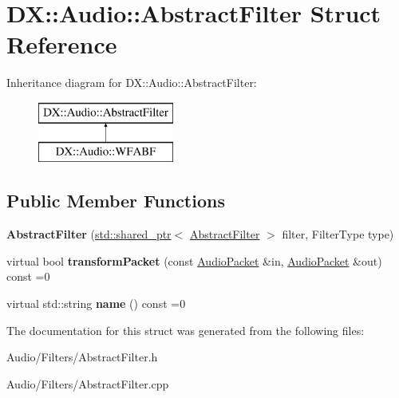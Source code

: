 \hypertarget{struct_d_x_1_1_audio_1_1_abstract_filter}{\section{D\-X\-:\-:Audio\-:\-:Abstract\-Filter Struct Reference}
\label{struct_d_x_1_1_audio_1_1_abstract_filter}
}
Inheritance diagram for D\-X\-:\-:Audio\-:\-:Abstract\-Filter\-:\begin{figure}[H]
\begin{center}
\leavevmode
\includegraphics[height=2.000000cm]{struct_d_x_1_1_audio_1_1_abstract_filter}
\end{center}
\end{figure}
\subsection*{Public Member Functions}
\begin{DoxyCompactItemize}
\item 
\hypertarget{struct_d_x_1_1_audio_1_1_abstract_filter_aa8bb18f87a623d1c03bf309ec3797d89}{{\bfseries Abstract\-Filter} (\hyperlink{classstd_1_1shared__ptr}{std\-::shared\-\_\-ptr}$<$ \hyperlink{struct_d_x_1_1_audio_1_1_abstract_filter}{Abstract\-Filter} $>$ filter, Filter\-Type type)}\label{struct_d_x_1_1_audio_1_1_abstract_filter_aa8bb18f87a623d1c03bf309ec3797d89}

\item 
\hypertarget{struct_d_x_1_1_audio_1_1_abstract_filter_a699796aa423c93b29a8d7f862dfba5e8}{virtual bool {\bfseries transform\-Packet} (const \hyperlink{class_d_x_1_1_audio_1_1_audio_packet}{Audio\-Packet} \&in, \hyperlink{class_d_x_1_1_audio_1_1_audio_packet}{Audio\-Packet} \&out) const =0}\label{struct_d_x_1_1_audio_1_1_abstract_filter_a699796aa423c93b29a8d7f862dfba5e8}

\item 
\hypertarget{struct_d_x_1_1_audio_1_1_abstract_filter_a590c1f45b9d7b5334489b13e68c61495}{virtual std\-::string {\bfseries name} () const =0}\label{struct_d_x_1_1_audio_1_1_abstract_filter_a590c1f45b9d7b5334489b13e68c61495}

\end{DoxyCompactItemize}


The documentation for this struct was generated from the following files\-:\begin{DoxyCompactItemize}
\item 
Audio/\-Filters/Abstract\-Filter.\-h\item 
Audio/\-Filters/Abstract\-Filter.\-cpp\end{DoxyCompactItemize}
